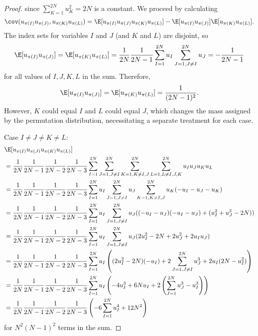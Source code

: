 \begin{proof}
  since $\sum_{K=1}^{2N}u_K^2 = 2N$ is a constant.  We proceed by calculating
  \begin{equation*}
    \cov(u_{\pi(I)}u_{\pi(J)},u_{\pi(K)}u_{\pi(L)})
    = \E[u_{\pi(I)}u_{\pi(J)}u_{\pi(K)}u_{\pi(L)}] - \E[u_{\pi(I)}u_{\pi(J)}]\E[u_{\pi(K)}u_{\pi(L)}].
  \end{equation*}
  The index sets for variables $I$ and $J$ (and $K$ and $L$) are disjoint, so
  \begin{equation*}
    \E[u_{\pi(I)}u_{\pi(J)}] = \E[u_{\pi(K)}u_{\pi(L)}]
    = \frac{1}{2N}\frac{1}{2N-1}\sum_{I=1}^{2N} u_{I} \sum_{J=1,J\neq I}^{2N} u_{J} = -\frac{1}{2N-1}
  \end{equation*}
  for all values of $I, J, K, L$ in the sum.  Therefore,
  \begin{equation*}
    \E[u_{\pi(I)}u_{\pi(J)}] = \E[u_{\pi(K)}u_{\pi(L)}] = \frac{1}{(2N-1)^2}.
  \end{equation*}
  However, $K$ could equal $I$ and $L$ could equal $J$, which changes the mass assigned by the
  permutation distribution, necessitating a separate treatment for each case.

  Case $I \neq J \neq K \neq L$:
  \begin{align*}
    &\E[u_{\pi(I)} u_{\pi(J)} u_{\pi(K)} u_{\pi(L)}] \\
    &= \frac{1}{2N}\frac{1}{2N-1}\frac{1}{2N-2}\frac{1}{2N-3}
    \sum_{I=1}^{2N} \sum_{J=1, J\neq I}^{2N} \sum_{K=1, K \neq I,J}^{2N} \sum_{L=1, L \neq I,J,K}^{2N}
    u_{I} u_{J} u_{K} u_{L} \\
    &= \frac{1}{2N}\frac{1}{2N-1}\frac{1}{2N-2}\frac{1}{2N-3}
    \sum_{I=1}^{2N} u_{I} \sum_{J=1, J\neq I}^{2N} u_{J} \sum_{K=1, K \neq
      I,J}^{2N} u_{K} (-u_{I}-u_{J}-u_{K}) \\
    &= \frac{1}{2N}\frac{1}{2N-1}\frac{1}{2N-2}\frac{1}{2N-3}
    \sum_{I=1}^{2N} u_{I} \sum_{J=1, J\neq I}^{2N} u_{J}
    ((-u_{I}-u_{J})(-u_{I}-u_{J})+(u_{I}^2+u_{J}^2-2N)) \\
    &= \frac{1}{2N}\frac{1}{2N-1}\frac{1}{2N-2}\frac{1}{2N-3}
    \sum_{I=1}^{2N} u_{I} \sum_{J=1, J\neq I}^{2N} u_{J}
    (2u_{I}^2-2N+2u_{J}^2+2u_{I}u_{J}) \\
    &= \frac{1}{2N}\frac{1}{2N-1}\frac{1}{2N-2}\frac{1}{2N-3}
    \sum_{I=1}^{2N} u_{I} \left (
      (2u_{I}^2-2N)(-u_{I})+2\sum_{J=1, J\neq I}^{2N} u_{J}^3+2u_{I}(2N-u_{I}^2)
    \right) \\
    &= \frac{1}{2N}\frac{1}{2N-1}\frac{1}{2N-2}\frac{1}{2N-3}
    \sum_{I=1}^{2N} u_{I} \left (
      -4u_{I}^3 + 6Nu_{I} + 2\left (\sum_{J=1}^{2N}u_{J}^3 - u_{I}^3 \right )
    \right) \\
    &= \frac{1}{2N}\frac{1}{2N-1}\frac{1}{2N-2}\frac{1}{2N-3}
    \left ( -6\sum_{I=1}^{2N}u_{I}^4+12N^2 \right )
  \end{align*}
  for $N^2(N-1)^2$ terms in the sum.


\end{proof}
